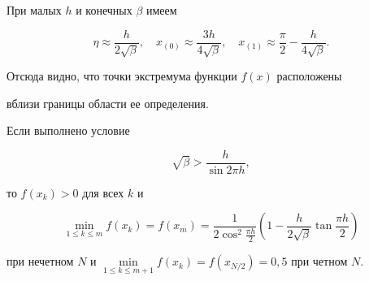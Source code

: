 \begin{notenonum}


При малых $h$ и конечных $\beta $ имеем


$$


\eta \approx \frac{h} {{2\sqrt \beta}},\quad x_{(0)} \approx


\frac{{3h}} {{4\sqrt \beta}},\quad x_{(1)} \approx \frac{\pi}


{2}-\frac{h} {{4\sqrt \beta}}.


$$


Отсюда видно, что точки экстремума функции $f(x)$ расположены


вблизи границы области ее определения.


\end{notenonum}





\begin{lem}\label{lemma2}


 Если выполнено условие


\begin{equation}\label{44}


\sqrt \beta > \frac{h} {{\sin 2\pi h}},


\end{equation}


то $f(x_{k})>0$ для всех $k$ и


$$


\min_{1 \leqslant k \leqslant m} f(x_k)=f(x_m)


=\frac{1}{{2\cos ^2 \tfrac{{\pi h}} {2}}}


\left({1-\frac{h}{{2\sqrt \beta}}\tan \frac{{\pi h}} {2}} \right)


$$


при нечетном $N$ и $\min\limits_{1 \leqslant k


\leqslant m+1} f(x_k)=f(x_{N/2})=0{,}5$ при четном $N$.


\end{lem}





